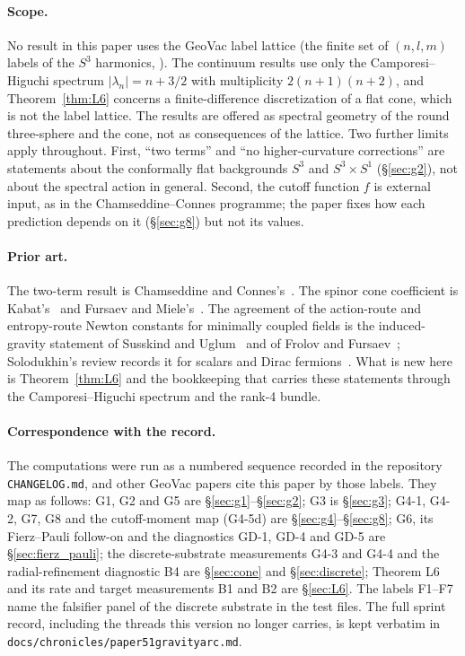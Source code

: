 \documentclass[11pt,a4paper]{article}
\theoremstyle{plain}
\theoremstyle{definition}
\newcommand{\sthree}{S^{3}}
\renewcommand{\_}{\textunderscore\allowbreak}
\begin{document}
\paragraph{Scope.} No result in this paper uses the GeoVac label lattice
(the finite set of $(n, l, m)$ labels of the $\sthree$ harmonics,
\cite{paper7}). The continuum results use only the Camporesi--Higuchi
spectrum $|\lambda_n| = n + 3/2$ with multiplicity $2(n+1)(n+2)$, and
Theorem~\ref{thm:L6} concerns a finite-difference discretization of a flat
cone, which is not the label lattice. The results are offered as spectral
geometry of the round three-sphere and the cone, not as consequences of
the lattice. Two further limits apply throughout. First, ``two terms''
and ``no higher-curvature corrections'' are statements about the
conformally flat backgrounds $\sthree$ and $\sthree \times S^1$
(\S\ref{sec:g2}), not about the spectral action in general. Second, the
cutoff function $f$ is external input, as in the Chamseddine--Connes
programme; the paper fixes how each prediction depends on it
(\S\ref{sec:g8}) but not its values.

\paragraph{Prior art.} The two-term result is Chamseddine and
Connes's~\cite{chamseddine_connes2008_uncanny}. The spinor cone coefficient
is Kabat's~\cite{kabat1995} and Fursaev and Miele's~\cite{fursaev_miele1996}.
The agreement of the action-route and entropy-route Newton constants for
minimally coupled fields is the induced-gravity statement of Susskind and
Uglum~\cite{susskind_uglum1994} and of Frolov and
Fursaev~\cite{frolov_fursaev1997}; Solodukhin's review records it for
scalars and Dirac fermions~\cite{solodukhin2011_review}. What is new here
is Theorem~\ref{thm:L6} and the bookkeeping that carries these statements
through the Camporesi--Higuchi spectrum and the rank-4 bundle.

\paragraph{Correspondence with the record.} The computations were run as
a numbered sequence recorded in the repository \texttt{CHANGELOG.md}, and
other GeoVac papers cite this paper by those labels. They map as follows:
G1, G2 and G5 are \S\ref{sec:g1}--\S\ref{sec:g2}; G3 is \S\ref{sec:g3};
G4-1, G4-2, G7, G8 and the cutoff-moment map (G4-5d) are
\S\ref{sec:g4}--\S\ref{sec:g8}; G6, its Fierz--Pauli follow-on and the
diagnostics GD-1, GD-4 and GD-5 are \S\ref{sec:fierz_pauli}; the
discrete-substrate measurements G4-3 and G4-4 and the radial-refinement
diagnostic B4 are \S\ref{sec:cone} and \S\ref{sec:discrete}; Theorem L6 and
its rate and target measurements B1 and B2 are \S\ref{sec:L6}. The labels
F1--F7 name the falsifier panel of the discrete substrate in the test files.
The full sprint record, including the threads this version no longer
carries, is kept verbatim in
\texttt{docs/chronicles/paper51\_gravity\_arc.md}.
\end{document}
